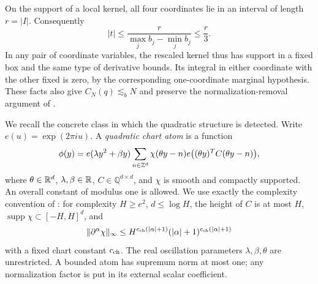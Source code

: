 On the support of a local kernel, all four coordinates lie in an
interval of length \(r=|I|\).  Consequently
\begin{equation}
 |t|\le\frac{r}{\max_j b_j-\min_j b_j}\le\frac r3.
 \label{eq:analytic-step-support}
\end{equation}
In any pair of coordinate variables, the rescaled kernel thus has
support in a fixed box and the same type of derivative bounds.  Its
integral in either coordinate with the other fixed is zero, by the
corresponding one-coordinate marginal hypothesis.  These facts also
give \(C_N(q)\lesssim_b N\) and preserve the normalization-removal
argument of \cite[Lemma~2.4]{H}.

We recall the concrete class in which the quadratic structure is
detected.  Write \(e(u)=\exp(2\pi i u)\).  A \emph{quadratic chart atom}
is a function
\begin{equation}
 \phi(y)=e(\lambda y^2+\beta y)
       \sum_{n\in\mathbb Z^d}\chi(\theta y-n)
          e\bigl((\theta y)^TC(\theta y-n)\bigr),
 \label{eq:analytic-chart}
\end{equation}
where \(\theta\in\mathbb R^d\), \(\lambda,\beta\in\mathbb R\), \(C\in\mathbb Q^{d\times d}\),
and \(\chi\) is smooth and compactly supported.  An overall constant
of modulus one is allowed.  We use exactly the complexity convention
of \cite[Definition~4.1]{H}: for complexity \(H\ge e^2\),
\(d\le\log H\), the height of \(C\) is at most \(H\),
\(\operatorname{supp}\chi\subset[-H,H]^d\), and
\[
 \lVert\partial^\alpha\chi\rVert_\infty
 \le H^{c_{\rm ch}(|\alpha|+1)}
             (|\alpha|+1)^{c_{\rm ch}(|\alpha|+1)}
\]
with a fixed chart constant \(c_{\rm ch}\).  The real oscillation
parameters \(\lambda,\beta,\theta\) are unrestricted.  A bounded atom
has supremum norm at most one; any normalization factor is put in its
external scalar coefficient.

